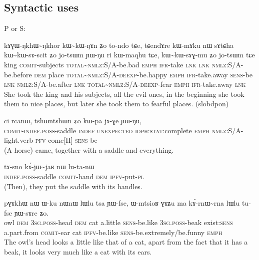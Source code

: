 \documentclass[oldfontcommands,oneside,a4paper,11pt]{article}
\newcommand{\ipa}[1]{{\phon #1}} %
\newcommand{\tld}{\textasciitilde{}}
\begin{document}
\subsection{Syntactic uses} 

P or S:

\begin{exe}
\ex
\gll \ipa{rɟɤlpu}  	\ipa{kɤɣɯ-ŋkhɯ\tld{}ŋkhor}  	\ipa{kɯ\tld{}kɯ-ŋɤn}  	\ipa{ʑo}  	\ipa{to-ndo}  	\ipa{tɕe,}  	\ipa{tɕendɤre}  	\ipa{kɯ-mɤku}  	\ipa{nɯ}  	\ipa{sɤtɕha}  	\ipa{kɯ\tld{}kɯ-sɤ-scit}  	\ipa{ʑo}  	\ipa{jo-tsɯm}  	\ipa{ɲɯ-ŋu}  	\ipa{ri}  	\ipa{kɯ-maqhu}  	\ipa{tɕe,}  	\ipa{kɯ\tld{}kɯ-sɤɣ-mu}  	\ipa{ʑo}  	\ipa{jo-tsɯm}  	\ipa{tɕe}  \\
king \textsc{comit}-subjects \textsc{total}\tld{}\textsc{nmlz}:S/A-be.bad \textsc{emph} \textsc{ifr}-take \textsc{lnk}  \textsc{lnk} \textsc{nmlz}:S/A-be.before \textsc{dem} place \textsc{total}\tld{}\textsc{nmlz}:S/A-\textsc{deexp}-be.happy \textsc{emph} \textsc{ifr}-take.away \textsc{sens}-be \textsc{lnk} \textsc{nmlz}:S/A-be.after \textsc{lnk} \textsc{total}\tld{}\textsc{nmlz}:S/A-\textsc{deexp}-fear \textsc{emph} \textsc{ifr}-take.away \textsc{lnk} \\
\glt She took the king and his subjects, all the evil ones, in the beginning she took them to nice places, but later she took them to fearful places. (slobdpon)
\end{exe}

\begin{exe}
\ex 
\gll \ipa{kɤɣɯ-tɤ-snɯ\tld{}sno}  	\ipa{ci}  	\ipa{rcanɯ,}  	\ipa{tshɯntshɯn}  	\ipa{ʑo}  	\ipa{kɯ-pa}  	\ipa{jɤ-ɣe}  	\ipa{ɲɯ-ŋu,}\\
 \textsc{comit-indef.poss}-saddle \textsc{indef} \textsc{unexpected} \textsc{idph:stat}:complete  \textsc{emph} \textsc{nmlz}:S/A-light.verb \textsc{pfv}-come[II] \textsc{sens}-be \\
\glt (A horse) came, together with a saddle and everything. 
\end{exe}


\begin{exe}
\ex
\gll
\ipa{tɤ-sno}  	\ipa{kɤ́-jɯ\tld{}jaʁ}  	\ipa{nɯ}  	\ipa{lu-ta-nɯ}  \\
\textsc{indef.poss}-saddle \textsc{comit}-hand \textsc{dem} \textsc{ipfv}-put-\textsc{pl} \\
\glt (Then), they put the saddle with its handles.
\end{exe}

\begin{exe}
\ex
\gll
\ipa{pɣɤkhɯ}  	\ipa{nɯ}  	\ipa{ɯ-ku}  	\ipa{nɯnɯ}  	\ipa{lɯlu}  	\ipa{tsa}  	\ipa{ɲɯ-fse,}  	\ipa{ɯ-mtsioʁ}  	\ipa{ɣɤʑu}  	\ipa{ma}  \ipa{kɤ́-rnɯ\tld{}rna}  	\ipa{lɯlu}  	\ipa{tu-fse}  	\ipa{ɲɯ-sɤre}  	\ipa{ʑo.}  \\
owl \textsc{dem} \textsc{3sg.poss}-head \textsc{dem} cat a.little \textsc{sens}-be.like \textsc{3sg.poss}-beak exist:\textsc{sens} a.part.from \textsc{comit}-ear cat \textsc{ipfv}-be.like \textsc{sens}-be.extremely/be.funny \textsc{emph} \\
\glt The owl's head looks a little like that of a cat, apart from the fact that it has a beak, it looks very much like a cat with its ears.
\end{exe}
\end{document}
